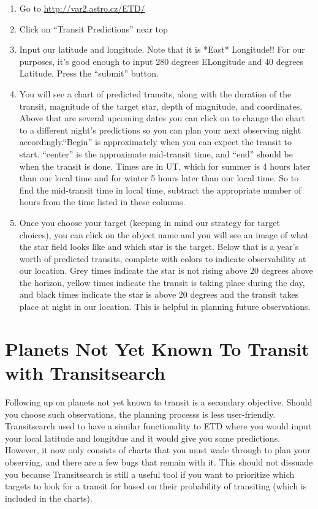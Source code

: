 \documentclass[12pt, preprint]{article}
\begin{document}
\begin{enumerate}
\item Go to \url{http://var2.astro.cz/ETD/}

\item Click on ``Transit Predictions''  near top

\item Input our latitude and longitude.  Note that it is *East* Longitude!!  For our purposes, it's good enough to input 280 degrees ELongitude and 40 degrees Latitude.  Press the ``submit'' button.

\item You will see a chart of predicted transits, along with  the duration of the transit, magnitude of the target star, depth of magnitude, and coordinates.  Above that are several upcoming dates you can click on to change the chart to a different night's predictions so you can plan your next observing night accordingly.``Begin'' is approximately when you can expect the transit to start.  ``center'' is the approximate mid-transit time, and ``end'' should be when the transit is done. Times are in UT, which for summer is 4 hours later than our local time and for winter 5 hours later than our local time.  So to find the mid-transit time in local time, subtract the appropriate number of hours from the time listed in these columns.

\item Once you choose your target (keeping in mind our strategy for target choices), you can click on the object name and you will see an image of what the star field looks like and which star is the target.  Below that is a year's worth of predicted transits, complete with colors to indicate observability at our location.  Grey times indicate the star is not rising above 20 degrees above the horizon, yellow times indicate the transit is taking place during the day, and black times indicate the  star is above 20 degrees and the transit takes place at night in our location.  This is helpful in planning future observations.
\end{enumerate}

\section{Planets Not Yet Known To Transit with Transitsearch}

Following up on planets not yet known to transit is a secondary objective.  Should you choose such observations, the planning processs is less user-friendly.  Transitsearch used to have a similar functionality to ETD where you would input your local latitude and longitdue and it would give you some predictions.  However, it now only consists of charts that you must wade through to plan your observing, and there are a few bugs that remain with it.  This should not dissuade you because Transitsearch is still a useful tool if you want to prioritize which targets to look for a transit for based on their probability of transiting (which is included in the charts).
\end{document}

